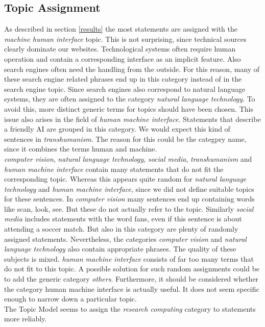 \subsection{Topic Assignment}
\label{topics}
As described in section \ref{results} the most statements are assigned with the \emph{machine human interface} topic.
This is not surprising, since technical sources clearly dominate our websites.
Technological systems often require human operation and contain a corresponding interface as an implicit feature.
Also search engines often need the handling from the outside.
For this reason, many of these search engine related phrases end up in this category instead of in the search engine topic.
Since search engines also correspond to natural language systems, they are often assigned to the category \emph{natural language technology}.
To avoid this, more distinct generic terms for topics should have been chosen.
This issue also arises in the field of \emph{human machine interface}.
Statements that describe a friendly AI are grouped in this category.
We would expect this kind of sentences in \emph{transhumanism}.
The reason for this could be the categpry name, since it combines the terms human and machine.
\\
\emph{computer vision}, \emph{natural language technology}, \emph{social media}, \emph{transhumanism} and \emph{human machine interface} contain many statements that do not fit the corresponding topic.
Whereas this appears quite random for \emph{natural language technology} and \emph{human machine interface}, since we did not define suitable topics for these sentences.
In \emph{computer vision} many sentences end up containing words like scan, look, see.
But these do not actually refer to the topic.
Similarly \emph{social media} includes  statements with the word fans, even if this sentence is about attending a soccer match.
But also in this category are plenty of randomly assigned statements.
Nevertheless, the categories \emph{computer vision} and \emph{natural language technology} also contain appropriate phrases.
The quality of these subjects is mixed.
\emph{human machine interface} consists of far too many terms that do not fit to this topic.
A possible solution for such random assignments could be to add the generic category \emph{others}.
Furthermore, it should be considered whether the category human machine interface is actually useful.
It does not seem specific enough to narrow down a particular topic.
\\
The Topic Model seems to assign the \emph{research computing} category to statements more reliably.
